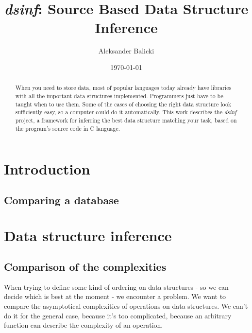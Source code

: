\documentclass[11pt]{article}
\title{\emph{dsinf}: Source Based Data Structure Inference}
\author{Aleksander Balicki}
\date{\today}
\begin{document}
\maketitle

\begin{abstract}

	When you need to store data,  most of popular languages today already
	have libraries with all the important data structures implemented.  Programmers just have to be taught when to
	use them.  Some of the cases of choosing the right data structure look sufficiently easy, so a computer could do
	it automatically. This work describes the \emph{dsinf} project, a framework for inferring the best data
	structure matching your task, based on the program's source code in C language. 

\end{abstract}

\pagebreak

\tableofcontents

\vfill

\section{Introduction}

	\subsection{Comparing a database} \label{sub:database}

\section{Data structure inference}

	\subsection{Comparison of the complexities}

		When trying to define some kind of ordering on data structures - so we can decide which is best at the
		moment - we encounter a problem.  We want to compare the asymptotical complexities of operations on data
		structures.  We can't do it for the general case, because it's too complicated, because an arbitrary
		function can describe the complexity of an operation.
\end{document}
